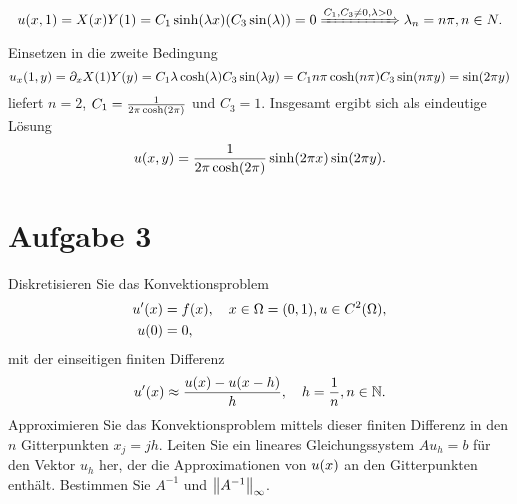 \documentclass{exercise}
\begin{document}
    \[
        u\parentheses*{x, 1} = X\parentheses*{x}Y\parentheses*{1} = C_1 \sinh\parentheses*{\lambda x}\parentheses*{C_3 \sin\parentheses*{\lambda}} = 0 \xRightarrow{C_1, C_3 \ne 0, \lambda > 0} \lambda_n = n\pi, n \in N.
    \]
    Einsetzen in die zweite Bedingung
    \[
        u_x\parentheses*{1, y} = \partial_x X\parentheses*{1}Y\parentheses*{y} = C_1 \lambda\cosh\parentheses*{\lambda}C_3\sin\parentheses*{\lambda y} = C_1 n\pi\cosh\parentheses*{n\pi}C_3 \sin\parentheses*{n\pi y} = \sin\parentheses*{2\pi y}
    \]
    liefert \(n = 2\), \(C_1 = \frac{1}{2\pi\cosh\parentheses*{2\pi}}\) und \(C_3 = 1\).
    Insgesamt ergibt sich als eindeutige Lösung
    \[
        u\parentheses*{x, y} = \frac{1}{2\pi\cosh\parentheses*{2\pi}}\sinh\parentheses*{2\pi x}\sin\parentheses*{2\pi y}.
    \]


    \section*{Aufgabe 3}

    \begin{problem}
        Diskretisieren Sie das Konvektionsproblem
        \begin{align*}
            u'\parentheses*{x} &= f\parentheses*{x}, \quad x \in \Omega = \parentheses*{0, 1}, u \in C^2\parentheses*{\Omega},\\
            u\parentheses*{0} &= 0,
        \end{align*}
        mit der einseitigen finiten Differenz
        \[
            u'\parentheses*{x} \approx \frac{u\parentheses*{x} - u\parentheses*{x - h}}{h}, \quad h = \frac{1}{n}, n \in \N.
        \]
        Approximieren Sie das Konvektionsproblem mittels dieser finiten Differenz in den \(n\) Gitterpunkten \(x_j = jh\).
        Leiten Sie ein lineares Gleichungssystem \(Au_h = b\) für den Vektor \(u_h\) her, der die Approximationen von \(u\parentheses*{x}\) an den Gitterpunkten enthält.
        Bestimmen Sie \(A^{-1}\) und \(\norm*{A^{-1}}_\infty\).
    \end{problem}
\end{document}
